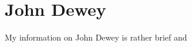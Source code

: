 \documentclass{article}
\begin{document}

\section{John Dewey}


My information on John Dewey is rather brief and 
\end{document}
